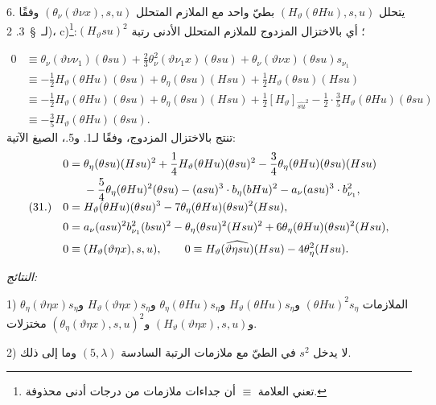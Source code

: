 \documentclass[11pt]{article}
\newcommand{\srcLTR}[1]{\relax\ifmmode\text{\mbox{\babelsublr{\foreignlanguage{english}{#1}}}}\else\babelsublr{\foreignlanguage{english}{#1}}\fi}
\newcommand{\srcfn}[2]{\begingroup\renewcommand{\thefootnote}{\srcLTR{#1}}\footnote{#2}\addtocounter{footnote}{-1}\endgroup}
\begin{document}
6. يتحلل $(H_\vartheta(\theta Hu),s,u)$ بطيّ واحد مع الملازم المتحلل $(\theta_\nu(\vartheta \nu x),s,u)$ وفقًا لـ~\S\ 3. 2)، c)؛ أي بالاختزال المزدوج للملازم المتحلل الأدنى رتبة $(H_\vartheta su)^2$:\srcfn{*)}{تعني العلامة $\equiv$ أن جداءات ملازمات من درجات أدنى محذوفة.}
\[
\begin{aligned}
0&\equiv \theta_\nu(\vartheta\nu\nu_1)(\theta su)+\frac23\theta_\nu^2(\vartheta \nu_1 x)(\theta su)+\theta_\nu(\vartheta \nu x)(\theta su)s_{\nu_1}\\
&\equiv -\frac12H_\vartheta(\theta Hu)(\theta su)+\theta_\eta(\theta su)(Hsu)+\frac12H_\vartheta(\theta su)(Hsu)\\
&\equiv -\frac12H_\vartheta(\theta Hu)(\theta su)+\theta_\eta(\theta su)(Hsu)+\frac12[H_\vartheta]_{\widehat{su}^2}-\frac12\cdot\frac35H_\vartheta(\theta Hu)(\theta su)\\
&\equiv -\frac35H_\vartheta(\theta Hu)(\theta su).
\end{aligned}
\]
تنتج بالاختزال المزدوج، وفقًا لـ1. و5.، الصيغ الآتية:
\[
\begin{array}{@{}r@{\quad}l@{}}
&\displaystyle
\begin{aligned}
0={}&\theta_\eta(\theta su)(Hsu)^2+\frac14H_\vartheta(\theta Hu)(\theta su)^2-\frac34\theta_\eta(\theta Hu)(\theta su)(Hsu)\\
&-\frac54\theta_\eta(\theta Hu)^2(\theta su)-(asu)^3\cdot b_\eta(bHu)^2-a_\nu(asu)^3\cdot b_{\nu_1}^2,
\end{aligned}\\[0.55em]
(31.)&\displaystyle 0=H_\vartheta(\theta Hu)(\theta su)^3-7\theta_\eta(\theta Hu)(\theta su)^2(Hsu),\\[0.55em]
&\displaystyle 0=a_\nu(asu)^2b_{\nu_1}^{2}(bsu)^2-\theta_\eta(\theta su)^2(Hsu)^2+6\theta_\eta(\theta Hu)(\theta su)^2(Hsu),\\[0.55em]
&\displaystyle 0\equiv (H_\vartheta(\vartheta\eta x),s,u),\qquad
0\equiv H_\vartheta(\widehat{\vartheta\eta su})(Hsu)-4\theta_\eta^2(Hsu).
\end{array}
\]

\noindent\emph{النتائج:}

1) الملازمات $(\theta Hu)^2s_\eta$ و$H_\vartheta(\theta Hu)s_\eta$ و$\theta_\eta(\theta Hu)s_\eta$ و$H_\vartheta(\vartheta\eta x)s_\eta$ و$\theta_\eta(\vartheta\eta x)s_\eta$ و$(H_\vartheta(\vartheta\eta x),s,u)$ و$(\theta_\eta(\vartheta\eta x),s,u)^2$ مختزلات.

2) لا يدخل $s^2$ في الطيّ مع ملازمات الرتبة السادسة $(5,\lambda)$ وما إلى ذلك.
\end{document}
